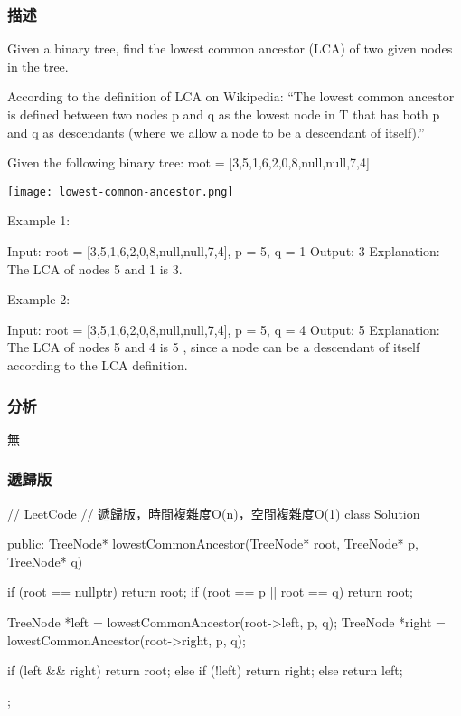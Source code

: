 \subsubsection{描述}
Given a binary tree, find the lowest common ancestor (LCA) of two given nodes in the tree.

According to the definition of LCA on Wikipedia: “The lowest common ancestor is defined between two nodes p and q as the lowest node in T that has both p and q as descendants (where we allow a node to be a descendant of itself).”

Given the following binary tree:  root = [3,5,1,6,2,0,8,null,null,7,4]

\begin{center}
\texttt{[image: lowest-common-ancestor.png]}\\
\label{fig:lowest-common-ancestor}
\end{center}

Example 1:
\begin{Code}
Input: root = [3,5,1,6,2,0,8,null,null,7,4], p = 5, q = 1
Output: 3
Explanation: The LCA of nodes 5 and 1 is 3.
\end{Code}


Example 2:
\begin{Code}
Input: root = [3,5,1,6,2,0,8,null,null,7,4], p = 5, q = 4
Output: 5
Explanation: The LCA of nodes 5 and 4 is 5
, since a node can be a descendant of itself according to the LCA definition.
\end{Code}

\subsubsection{分析}
無


\subsubsection{遞歸版}
\begin{Code}
// LeetCode
// 遞歸版，時間複雜度O(n)，空間複雜度O(1)
class Solution {
public:
    TreeNode* lowestCommonAncestor(TreeNode* root, TreeNode* p, TreeNode* q) {
        if (root == nullptr) return root;
        if (root == p || root == q) return root;

        TreeNode *left = lowestCommonAncestor(root->left, p, q);
        TreeNode *right = lowestCommonAncestor(root->right, p, q);

        if (left && right) return root;
        else if (!left) return right;
        else return left;
    }
};
\end{Code}



